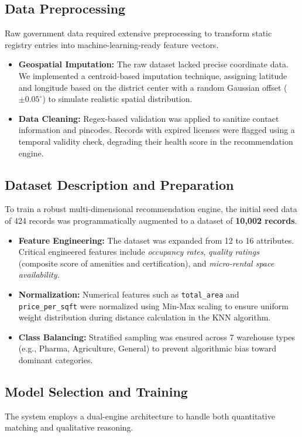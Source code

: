 \documentclass[conference]{IEEEtran}
\begin{document}
\subsection{Data Preprocessing}
Raw government data required extensive preprocessing to transform static registry entries into machine-learning-ready feature vectors.
\begin{itemize}
    \item \textbf{Geospatial Imputation:} The raw dataset lacked precise coordinate data. We implemented a centroid-based imputation technique, assigning latitude and longitude based on the district center with a random Gaussian offset ($\pm 0.05^\circ$) to simulate realistic spatial distribution.
    \item \textbf{Data Cleaning:} Regex-based validation was applied to sanitize contact information and pincodes. Records with expired licenses were flagged using a temporal validity check, degrading their health score in the recommendation engine.
\end{itemize}

\subsection{Dataset Description and Preparation}
To train a robust multi-dimensional recommendation engine, the initial seed data of 424 records was programmatically augmented to a dataset of \textbf{10,002 records}.
\begin{itemize}
    \item \textbf{Feature Engineering:} The dataset was expanded from 12 to 16 attributes. Critical engineered features include \textit{occupancy rates}, \textit{quality ratings} (composite score of amenities and certification), and \textit{micro-rental space availability}.
    \item \textbf{Normalization:} Numerical features such as \texttt{total\_area} and \texttt{price\_per\_sqft} were normalized using Min-Max scaling to ensure uniform weight distribution during distance calculation in the KNN algorithm.
    \item \textbf{Class Balancing:} Stratified sampling was ensured across 7 warehouse types (e.g., Pharma, Agriculture, General) to prevent algorithmic bias toward dominant categories.
\end{itemize}

\subsection{Model Selection and Training}
The system employs a dual-engine architecture to handle both quantitative matching and qualitative reasoning.
\end{document}
